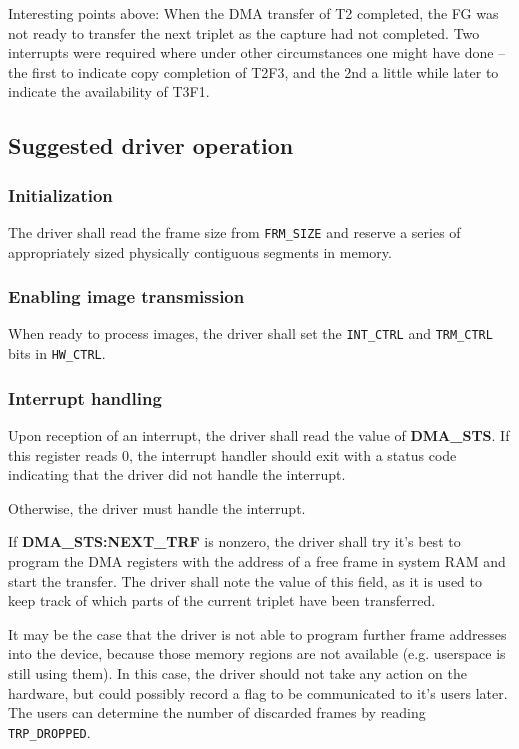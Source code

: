 \documentclass[12pt]{article}
\begin{document}
Interesting points above: When the DMA transfer of T2 completed, the FG was not ready to transfer the next triplet as the capture had not completed. Two interrupts were required where under other circumstances one might have done -- the first to indicate copy completion of T2F3, and the 2nd a little while later to indicate the availability of T3F1.

\subsection{Suggested driver operation}

\subsubsection{Initialization}

The driver shall read the frame size from \texttt{FRM\_SIZE} and reserve a series of appropriately sized physically contiguous segments in memory.

\subsubsection{Enabling image transmission}

When ready to process images, the driver shall set the \texttt{INT\_CTRL} and \texttt{TRM\_CTRL} bits in \texttt{HW\_CTRL}.

\subsubsection{Interrupt handling}

Upon reception of an interrupt, the driver shall read the value of \textbf{DMA\_STS}. If this register reads 0, the interrupt handler should exit with a status code indicating that the driver did not handle the interrupt.

Otherwise, the driver must handle the interrupt.

If \textbf{DMA\_STS:NEXT\_TRF} is nonzero, the driver shall try it's best to program the DMA registers with the address of a free frame in system RAM and start the transfer. The driver shall note the value of this field, as it is used to keep track of which parts of the current triplet have been transferred.

It may be the case that the driver is not able to program further frame addresses into the device, because those memory regions are not available (e.g. userspace is still using them). In this case, the driver should not take any action on the hardware, but could possibly record a flag to be communicated to it's users later. The users can determine the number of discarded frames by reading \texttt{TRP\_DROPPED}.
\end{document}
